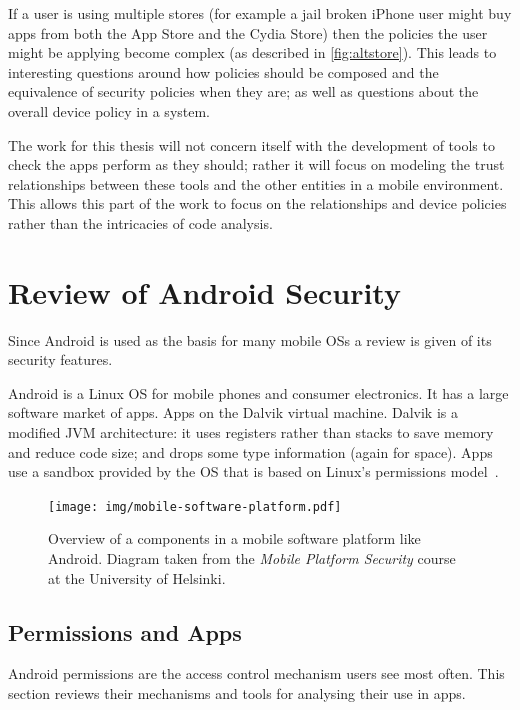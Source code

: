 \documentclass[a4paper,sfsidenotes]{%
  article%
}
\begin{document}
If a user is using multiple stores (for example a jail broken iPhone user might
buy apps from both the App Store and the Cydia Store) then the policies the user
might be applying become complex (as described in \autoref{fig:altstore}).
This leads to interesting questions around how policies should be composed and
the equivalence of security policies when they are; as well as questions about
the overall device policy in a system.

The work for this thesis will not concern itself with the development of tools
to check the apps perform as they should; rather it will focus on modeling the
trust relationships between these tools and the other entities in a mobile
environment.  This allows this part of the work to focus on the relationships
and device policies rather than the intricacies of code analysis.


\section{Review of Android Security}

Since Android is used as the basis for many mobile OSs a review is given of its
security features.

Android is a Linux OS for mobile phones and consumer electronics. It has a large
software market of apps. Apps on the Dalvik virtual machine.  Dalvik is a
modified JVM architecture: it uses registers rather than stacks to save memory
and reduce code size; and drops some type information (again for space).  Apps
use a sandbox provided by the OS that is based on Linux's permissions
model~\cite{Drake:2014uq}.

\begin{figure}
  \centering
  \texttt{[image: img/mobile-software-platform.pdf]}
  \caption{Overview of a components in a mobile software platform like Android.
    Diagram taken from the \emph{Mobile Platform Security} course at the
  University of Helsinki.}%
  \label{fig:mobilesoftwareplatform}
\end{figure}

\subsection{Permissions and Apps}

Android permissions are the access control mechanism users see most often.  This
section reviews their mechanisms and tools for analysing their use in apps.
\end{document}
